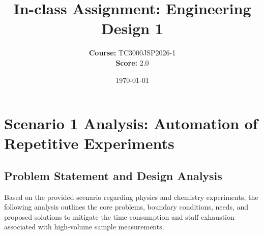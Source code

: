 \documentclass{article}
\title{\textbf{In-class Assignment: Engineering Design 1}}
\author{\textbf{Course:} TC3000JSP2026-1 \\ \textbf{Score:} 2.0}
\date{\today}
\begin{document}
\maketitle

\section*{Scenario 1 Analysis: Automation of Repetitive Experiments}

\subsection*{Problem Statement and Design Analysis}
Based on the provided scenario regarding physics and chemistry experiments, the following analysis outlines the core problems, boundary conditions, needs, and proposed solutions to mitigate the time consumption and staff exhaustion associated with high-volume sample measurements.
\end{document}
